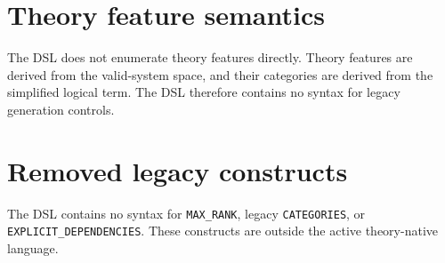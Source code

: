 \documentclass[english,10pt,a4paper,draft,onecolumn]{article}
\begin{document}
\section{Theory feature semantics}
The DSL does not enumerate theory features directly. Theory features are derived from the valid-system space, and their categories are derived from the simplified logical term. The DSL therefore contains no syntax for legacy generation controls.

\section{Removed legacy constructs}
The DSL contains no syntax for \texttt{MAX\_RANK}, legacy \texttt{CATEGORIES}, or \texttt{EXPLICIT\_DEPENDENCIES}. These constructs are outside the active theory-native language.
\end{document}
